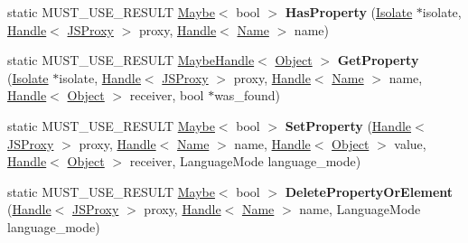 \begin{DoxyCompactItemize}
\item 
static M\+U\+S\+T\+\_\+\+U\+S\+E\+\_\+\+R\+E\+S\+U\+LT \hyperlink{classv8_1_1_maybe}{Maybe}$<$ bool $>$ {\bfseries Has\+Property} (\hyperlink{classv8_1_1internal_1_1_isolate}{Isolate} $\ast$isolate, \hyperlink{classv8_1_1internal_1_1_handle}{Handle}$<$ \hyperlink{classv8_1_1internal_1_1_j_s_proxy}{J\+S\+Proxy} $>$ proxy, \hyperlink{classv8_1_1internal_1_1_handle}{Handle}$<$ \hyperlink{classv8_1_1internal_1_1_name}{Name} $>$ name)\hypertarget{classv8_1_1internal_1_1_j_s_proxy_a49c91539e483dd64d08ef138a18a839e}{}\label{classv8_1_1internal_1_1_j_s_proxy_a49c91539e483dd64d08ef138a18a839e}

\item 
static M\+U\+S\+T\+\_\+\+U\+S\+E\+\_\+\+R\+E\+S\+U\+LT \hyperlink{classv8_1_1internal_1_1_maybe_handle}{Maybe\+Handle}$<$ \hyperlink{classv8_1_1internal_1_1_object}{Object} $>$ {\bfseries Get\+Property} (\hyperlink{classv8_1_1internal_1_1_isolate}{Isolate} $\ast$isolate, \hyperlink{classv8_1_1internal_1_1_handle}{Handle}$<$ \hyperlink{classv8_1_1internal_1_1_j_s_proxy}{J\+S\+Proxy} $>$ proxy, \hyperlink{classv8_1_1internal_1_1_handle}{Handle}$<$ \hyperlink{classv8_1_1internal_1_1_name}{Name} $>$ name, \hyperlink{classv8_1_1internal_1_1_handle}{Handle}$<$ \hyperlink{classv8_1_1internal_1_1_object}{Object} $>$ receiver, bool $\ast$was\+\_\+found)\hypertarget{classv8_1_1internal_1_1_j_s_proxy_a218807b402c79a90970ed60212ae9b96}{}\label{classv8_1_1internal_1_1_j_s_proxy_a218807b402c79a90970ed60212ae9b96}

\item 
static M\+U\+S\+T\+\_\+\+U\+S\+E\+\_\+\+R\+E\+S\+U\+LT \hyperlink{classv8_1_1_maybe}{Maybe}$<$ bool $>$ {\bfseries Set\+Property} (\hyperlink{classv8_1_1internal_1_1_handle}{Handle}$<$ \hyperlink{classv8_1_1internal_1_1_j_s_proxy}{J\+S\+Proxy} $>$ proxy, \hyperlink{classv8_1_1internal_1_1_handle}{Handle}$<$ \hyperlink{classv8_1_1internal_1_1_name}{Name} $>$ name, \hyperlink{classv8_1_1internal_1_1_handle}{Handle}$<$ \hyperlink{classv8_1_1internal_1_1_object}{Object} $>$ value, \hyperlink{classv8_1_1internal_1_1_handle}{Handle}$<$ \hyperlink{classv8_1_1internal_1_1_object}{Object} $>$ receiver, Language\+Mode language\+\_\+mode)\hypertarget{classv8_1_1internal_1_1_j_s_proxy_a6359af306d202f90e1464a0fb8b877c4}{}\label{classv8_1_1internal_1_1_j_s_proxy_a6359af306d202f90e1464a0fb8b877c4}

\item 
static M\+U\+S\+T\+\_\+\+U\+S\+E\+\_\+\+R\+E\+S\+U\+LT \hyperlink{classv8_1_1_maybe}{Maybe}$<$ bool $>$ {\bfseries Delete\+Property\+Or\+Element} (\hyperlink{classv8_1_1internal_1_1_handle}{Handle}$<$ \hyperlink{classv8_1_1internal_1_1_j_s_proxy}{J\+S\+Proxy} $>$ proxy, \hyperlink{classv8_1_1internal_1_1_handle}{Handle}$<$ \hyperlink{classv8_1_1internal_1_1_name}{Name} $>$ name, Language\+Mode language\+\_\+mode)\hypertarget{classv8_1_1internal_1_1_j_s_proxy_a7a96bf1368adcafd3d66e429c67c103f}{}\label{classv8_1_1internal_1_1_j_s_proxy_a7a96bf1368adcafd3d66e429c67c103f}


\end{DoxyCompactItemize}
